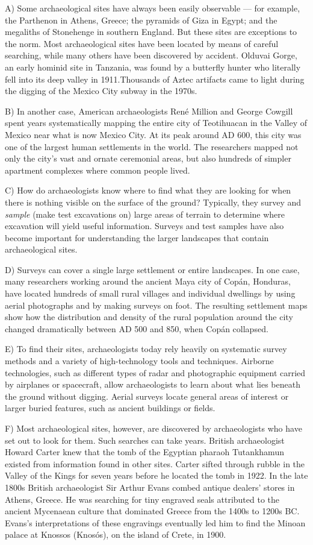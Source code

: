 \documentclass[UTF8,11pt]{ctexart}
\begin{document}
A) Some archaeological sites have always been easily observable — for example, the Parthenon in Athens, Greece; the pyramids of Giza in Egypt; and the megaliths of Stonehenge in southern England. But these sites are exceptions to the norm. Most archaeological sites have been located by means of careful searching, while many others have been discovered by accident. Olduvai Gorge, an early hominid site in Tanzania, was found by a butterfly hunter who literally fell into its deep valley in 1911.Thousands of Aztec artifacts came to light during the digging of the Mexico City subway in the 1970s.


B) In another case, American archaeologists René Million and George Cowgill spent years systematically mapping the entire city of Teotihuacan in the Valley of Mexico near what is now Mexico City. At its peak around AD 600, this city was one of the largest human settlements in the world. The researchers mapped not only the city’s vast and ornate ceremonial areas, but also hundreds of simpler apartment complexes where common people lived.


C) How do archaeologists know where to find what they are looking for when there is nothing visible on the surface of the ground? Typically, they survey and \textit{sample} (make test excavations on) large areas of terrain to determine where excavation will yield useful information. Surveys and test samples have also become important for understanding the larger landscapes that contain archaeological sites.


D) Surveys can cover a single large settlement or entire landscapes. In one case, many researchers working around the ancient Maya city of Copán, Honduras, have located hundreds of small rural villages and individual dwellings by using aerial photographs and by making surveys on foot. The resulting settlement maps show how the distribution and density of the rural population around the city changed dramatically between AD 500 and 850, when Copán collapsed.


E) To find their sites, archaeologists today rely heavily on systematic survey methods and a variety of high-technology tools and techniques. Airborne technologies, such as different types of radar and photographic equipment carried by airplanes or spacecraft, allow archaeologists to learn about what lies beneath the ground without digging. Aerial surveys locate general areas of interest or larger buried features, such as ancient buildings or fields.


F) Most archaeological sites, however, are discovered by archaeologists who have set out to look for them. Such searches can take years. British archaeologist Howard Carter knew that the tomb of the Egyptian pharaoh Tutankhamun existed from information found in other sites. Carter sifted through rubble in the Valley of the Kings for seven years before he located the tomb in 1922. In the late 1800s British archaeologist Sir Arthur Evans combed antique dealers’ stores in Athens, Greece. He was searching for tiny engraved seals attributed to the ancient Mycenaean culture that dominated Greece from the 1400s to 1200s BC. Evans’s interpretations of these engravings eventually led him to find the Minoan palace at Knossos (Knosós), on the island of Crete, in 1900.
\end{document}
